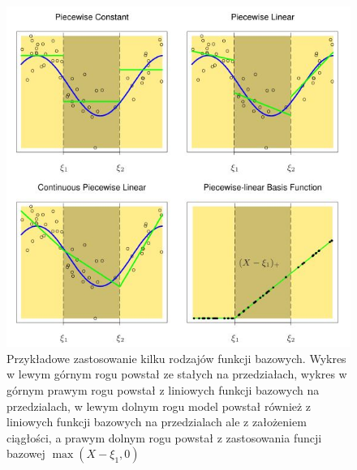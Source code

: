 \documentclass[]{book}
\theoremstyle{plain}
\theoremstyle{definition}
\theoremstyle{definition}
\theoremstyle{definition}
\theoremstyle{definition}
\theoremstyle{remark}
\begin{document}
\begin{figure}

{\centering \includegraphics{images/spline1} 

}

\caption{Przykładowe zastosowanie kilku rodzajów funkcji bazowych. Wykres w lewym górnym rogu powstał ze stałych na przedziałach, wykres w górnym prawym rogu powstał z liniowych funkcji bazowych na przedzialach, w lewym dolnym rogu model powstał również z liniowych funkcji bazowych na przedzialach ale z założeniem ciągłości, a prawym dolnym rogu powstał z zastosowania funcji bazowej $\max(X-\xi_1,0)$}\label{fig:spline1}
\end{figure}
\end{document}
